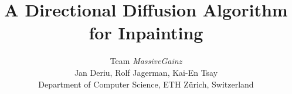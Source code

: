 \documentclass[10pt,conference,compsocconf]{IEEEtran}
\begin{document}
\title{A Directional Diffusion Algorithm for Inpainting}

\author{
  Team \textit{MassiveGainz}\\Jan Deriu, Rolf Jagerman, Kai-En Tsay\\
  Department of Computer Science, ETH Zürich, Switzerland
}

\maketitle


















\end{document}
